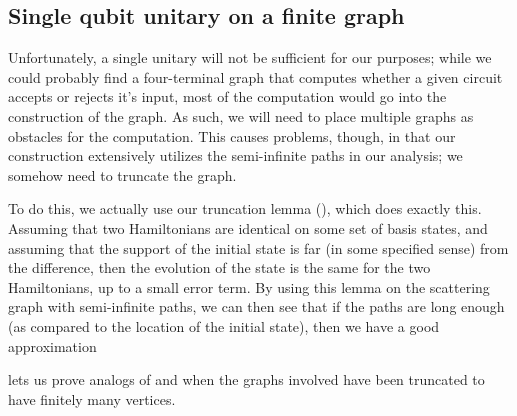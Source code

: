 \documentclass[../thesis-main/thesis-main]{subfiles}
\begin{document}
\subsection{Single qubit unitary on a finite graph}


Unfortunately, a single unitary will not be sufficient  for our purposes; while we could probably find a four-terminal graph that computes whether a given circuit accepts or rejects it's input, most of the computation would go into the construction of the graph.  As such, we will need to place multiple graphs as obstacles for the computation.  This causes problems, though, in that our construction extensively utilizes the semi-infinite paths in our analysis; we somehow need to truncate the graph.

To do this, we actually use our truncation lemma (), which does exactly this.  Assuming that two Hamiltonians are identical on some set of basis states, and assuming that the support of the initial state is far (in some specified sense) from the difference, then the evolution of the state is the same for the two Hamiltonians, up to a small error term.  By using this lemma on the scattering graph with semi-infinite paths, we can then see that if the paths are long enough (as compared to the location of the initial state), then we have a good approximation 

 lets us prove analogs of  and  when the graphs involved have been truncated to have finitely many vertices.
\end{document}
